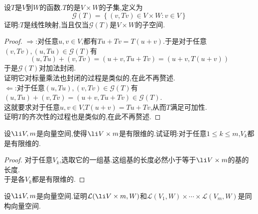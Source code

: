 \documentclass{ctexart}
\begin{document}
\pagestyle{empty}
\begin{center}
    \large{}
\end{center}
\begin{problem}[1.]
    设$T$是$V$到$W$的函数.$T$的是$V\times W$的子集,定义为
    $$\mathcal{G}(T)=\left\{(v,Tv)\in V\times W:v\in V\right\}$$
    证明:$T$是线性映射,当且仅当$\mathcal{G}(T)$是$V\times W$的子空间.
\end{problem}
\begin{proof}
    $\Rightarrow$:对任意$u,v\in V$,都有$Tu+Tv=T(u+v)$.于是对于任意$(v,Tv),(u,Tu)\in\mathcal{G}(T)$有
    $$(u,Tu)+(v,Tv)=(u+v,Tu+Tv)=(u+v,T(u+v))$$
    于是$\mathcal{G}(T)$对加法封闭.\\
    证明它对标量乘法也封闭的过程是类似的,在此不再赘述.\\
    $\Leftarrow$:对于任意$(u,Tu),(v,Tv)\in\mathcal{G}(T)$有$(u,Tu)+(v,Tv)=(u+v,Tu+Tv)\in\mathcal{G}(T)$.\\
    这就要求对于任意$u,v\in V$,$T(u+v)=Tu+Tv$,从而$T$满足可加性.\\
    证明$T$的齐次性的过程也是类似的,在此不再赘述.
\end{proof}
\begin{problem}[2.]
    设$\li V,m$是向量空间,使得$\li V\times m$是有限维的.试证明:对于任意$1\leqslant k\leqslant m$,$V_k$都是有限维的.
\end{problem}
\begin{proof}
    对于任意$V_k$,选取它的一组基.这组基的长度必然小于等于$\li V\times m$的基的长度.\\
    于是各$V_k$都是有限维的.
\end{proof}
\begin{problem}[3.]
    设$\li V,m$是向量空间.证明$\mathcal{L}(\li V\times m,W)$和$\mathcal{L}(V_1,W)\times\cdots\times\mathcal{L}(V_m,W)$是同构向量空间.
\end{problem}
\end{document}
